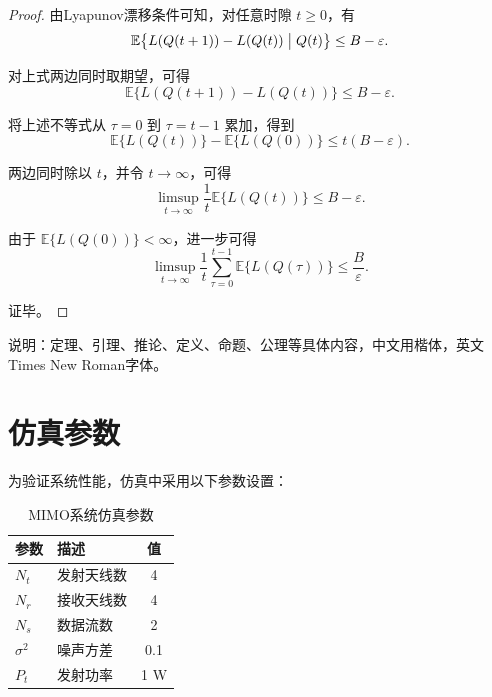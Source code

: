 \begin{proof}
由Lyapunov漂移条件可知，对任意时隙 $t\geq 0$，有
\begin{equation}
\mathbb{E}\bigl\{L(Q(t+1))-L(Q(t))\bigm|Q(t)\bigr\}\leq B-\varepsilon.
\end{equation}

对上式两边同时取期望，可得
\begin{equation}
\mathbb{E}\bigl\{L(Q(t+1))-L(Q(t))\bigr\}\leq B-\varepsilon.
\end{equation}

将上述不等式从 $\tau=0$ 到 $\tau=t-1$ 累加，得到
\begin{equation}
\mathbb{E}\bigl\{L(Q(t))\bigr\}-\mathbb{E}\bigl\{L(Q(0))\bigr\}\leq t(B-\varepsilon).
\end{equation}

两边同时除以 $t$，并令 $t\to\infty$，可得
\begin{equation}
\limsup_{t\to\infty}\frac{1}{t}\mathbb{E}\bigl\{L(Q(t))\bigr\}\leq B-\varepsilon.
\end{equation}

由于 $\mathbb{E}\{L(Q(0))\}<\infty$，进一步可得
\begin{equation}
\limsup_{t\to\infty}\frac{1}{t}\sum_{\tau=0}^{t-1}\mathbb{E}\{L(Q(\tau))\}\leq \frac{B}{\varepsilon}.
\end{equation}

证毕。
\end{proof}

说明：定理、引理、推论、定义、命题、公理等具体内容，中文用楷体，英文Times New Roman字体。


\section{仿真参数}

为验证系统性能，仿真中采用以下参数设置：

\begin{table}[ht]
  \centering
  \caption{MIMO系统仿真参数}
  \label{tab:mimo_parameters}
  \begin{tabular}{llc}
    \toprule
    参数 & 描述 & 值 \\
    \midrule
    \(N_t\) & 发射天线数 & 4 \\
    \(N_r\) & 接收天线数 & 4 \\
    \(N_s\) & 数据流数 & 2 \\
    \(\sigma^2\) & 噪声方差 & 0.1 \\
    \(P_t\) & 发射功率 & 1 W \\
    \bottomrule
  \end{tabular}
\end{table}